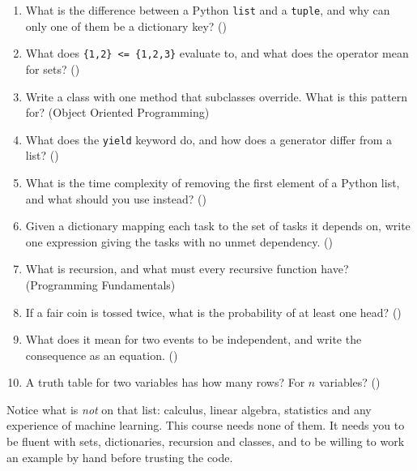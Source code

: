 \begin{enumerate}[leftmargin=2.4em, itemsep=4pt, topsep=4pt]
  \item What is the difference between a Python \texttt{list} and a
        \texttt{tuple}, and why can only one of them be a dictionary key?
        \hfill{\scriptsize\color{neutral}()}
  \item What does \texttt{\{1,2\} <= \{1,2,3\}} evaluate to, and what does the
        operator mean for sets? \hfill{\scriptsize\color{neutral}()}
  \item Write a class with one method that subclasses override. What is this
        pattern for? \hfill{\scriptsize\color{neutral}(Object Oriented
        Programming)}
  \item What does the \texttt{yield} keyword do, and how does a generator differ
        from a list? \hfill{\scriptsize\color{neutral}()}
  \item What is the time complexity of removing the first element of a Python
        list, and what should you use instead? \hfill{\scriptsize\color{neutral}()}
  \item Given a dictionary mapping each task to the set of tasks it depends on,
        write one expression giving the tasks with no unmet dependency.
        \hfill{\scriptsize\color{neutral}()}
  \item What is recursion, and what must every recursive function have?
        \hfill{\scriptsize\color{neutral}(Programming Fundamentals)}
  \item If a fair coin is tossed twice, what is the probability of at least one
        head? \hfill{\scriptsize\color{neutral}()}
  \item What does it mean for two events to be independent, and write the
        consequence as an equation. \hfill{\scriptsize\color{neutral}()}
  \item A truth table for two variables has how many rows? For $n$ variables?
        \hfill{\scriptsize\color{neutral}()}
\end{enumerate}

\begin{conceptbox}
Notice what is \emph{not} on that list: calculus, linear algebra, statistics and
any experience of machine learning. This course needs none of them. It needs you to
be fluent with sets, dictionaries, recursion and classes, and to be willing to work
an example by hand before trusting the code.
\end{conceptbox}

\newpage
\tableofcontents
\newpage
\listoffigures
\newpage

